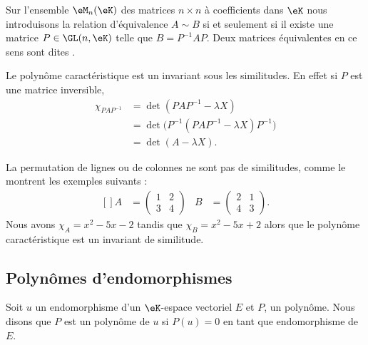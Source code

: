 Sur l'ensemble \( \eM_n(\eK)\) des matrices \( n\times n\) à coefficients dans \(\eK\) nous introduisons la relation d'équivalence \( A\sim B\) si et seulement si il existe une matrice \( P\in\GL(n,\eK)\) telle que \( B=P^{-1}AP\). Deux matrices équivalentes en ce sens sont dites .

Le polynôme caractéristique est un invariant sous les similitudes. En effet si \( P\) est une matrice inversible,
\begin{subequations}
    \begin{align}
        \chi_{PAP^{-1}}&=\det(PAP^{-1}-\lambda X)\\
        &=\det\big( P^{-1}(PAP^{-1}-\lambda X)P^{-1} \big)\\
        &=\det(A-\lambda X).
    \end{align}
\end{subequations}

La permutation de lignes ou de colonnes ne sont pas de similitudes, comme le montrent les exemples suivants :
\begin{equation}
    \begin{aligned}[]
        A&=\begin{pmatrix}
            1    &   2    \\ 
            3    &   4    
        \end{pmatrix}&
        B&=\begin{pmatrix}
            2    &   1    \\ 
            4    &   3    
        \end{pmatrix}.
    \end{aligned}
\end{equation}
Nous avons \( \chi_A=x^2-5x-2\) tandis que \( \chi_B=x^2-5x+2\) alors que le polynôme caractéristique est un invariant de similitude.


\subsection{Polynômes d'endomorphismes}

Soit \( u\) un endomorphisme d'un \( \eK\)-espace vectoriel \( E\) et \( P\), un polynôme. Nous disons que \( P\) est un polynôme  de \( u\) si \( P(u)=0\) en tant que endomorphisme de \( E\).

